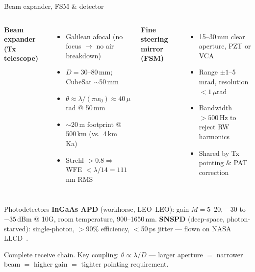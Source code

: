 \documentclass{KAIST-slide}
\newcommand{\si}{\item[\textcolor{islcorange}{\ding{167}}]}    %
\newcommand{\key}[1]{\textcolor{islcblue}{\textbf{#1}}}        %
\begin{document}
\begin{frame}[allowframebreaks=1.2]{Beam expander, FSM \& detector}
    \begin{columns}[T]
        \textbf{Beam expander (Tx telescope)}
        \begin{itemize}\footnotesize
            \si Galilean afocal (no focus $\to$ no air breakdown)
            \si $D = 30$--80\,mm; CubeSat $\sim$50\,mm
            \si $\theta \approx \lambda/(\pi w_0)\approx40\,\mu$rad @ 50\,mm
            \si $\sim$20\,m footprint @ 500\,km (vs.\ 4\,km Ka)
            \si Strehl $>0.8 \Rightarrow$ WFE $<\lambda/14=111$\,nm RMS
        \end{itemize}
        \textbf{Fine steering mirror (FSM)}
        \begin{itemize}\footnotesize
            \si 15--30\,mm clear aperture, PZT or VCA
            \si Range $\pm1$--5\,mrad, resolution $<1\,\mu$rad
            \si Bandwidth $>500$\,Hz to reject RW harmonics
            \si Shared by Tx pointing \& PAT correction
        \end{itemize}
    \end{columns}
    \framebreak
    \begin{block}{Photodetectors}
    \footnotesize
    \key{InGaAs APD} (workhorse, LEO--LEO): gain $M=5$--20, $-30$ to $-35$\,dBm @ 10G, room temperature, 900--1650\,nm. \quad
    \key{SNSPD} (deep-space, photon-starved): single-photon, $>$90\% efficiency, $<$50\,ps jitter --- flown on NASA LLCD~\cite{boroson2014llcd}.
    \end{block}
    \begin{center}\scriptsize
    \end{center}
    \centering\footnotesize Complete receive chain. \quad Key coupling: $\theta\propto\lambda/D$ --- larger aperture $=$ narrower beam $=$ higher gain $=$ tighter pointing requirement.
\end{frame}
\end{document}
